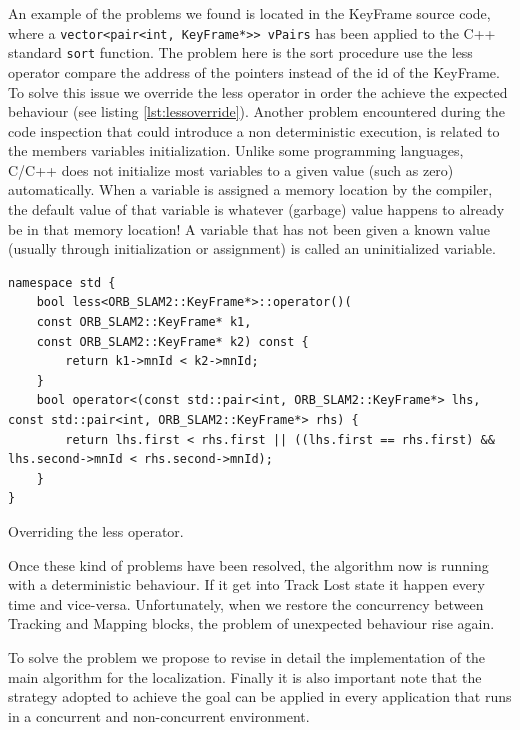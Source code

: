 An example of the problems we found is located in the KeyFrame source code, where a \texttt{vector<pair<int, KeyFrame*>> vPairs} has been applied to the C++ standard \texttt{sort} function. The problem here is the sort procedure use the less operator compare the address of the pointers instead of the id of the KeyFrame.
To solve this issue we override the less operator in order the achieve the expected behaviour (see listing \ref{lst:lessoverride}).
Another problem encountered during the code inspection that could introduce a non deterministic execution, is related to the members variables initialization.
Unlike some programming languages, C/C++ does not initialize most variables to a given value (such as zero) automatically. When a variable is assigned a memory location by the compiler, the default value of that variable is whatever (garbage) value happens to already be in that memory location! A variable that has not been given a known value (usually through initialization or assignment) is called an uninitialized variable.

\begin{listing}[tbp]
\begin{verbatim}
namespace std {
    bool less<ORB_SLAM2::KeyFrame*>::operator()(
    const ORB_SLAM2::KeyFrame* k1,
    const ORB_SLAM2::KeyFrame* k2) const {
        return k1->mnId < k2->mnId;
    }
    bool operator<(const std::pair<int, ORB_SLAM2::KeyFrame*> lhs, const std::pair<int, ORB_SLAM2::KeyFrame*> rhs) {
        return lhs.first < rhs.first || ((lhs.first == rhs.first) && lhs.second->mnId < rhs.second->mnId);
    }
}
\end{verbatim} 
\caption{Overriding the less operator.}
\label{lst:lessoverride}
\end{listing}

Once these kind of problems have been resolved, the algorithm now is running with a deterministic behaviour. If it get into Track Lost state it happen every time and vice-versa. Unfortunately, when we restore the concurrency between Tracking and Mapping blocks, the problem of unexpected behaviour rise again.

To solve the problem we propose to revise in detail the implementation of the main algorithm for the localization. 
Finally it is also important note that the strategy adopted to achieve the goal can be applied in every application that runs in a concurrent and non-concurrent environment.









\clearpage
\thispagestyle{empty}